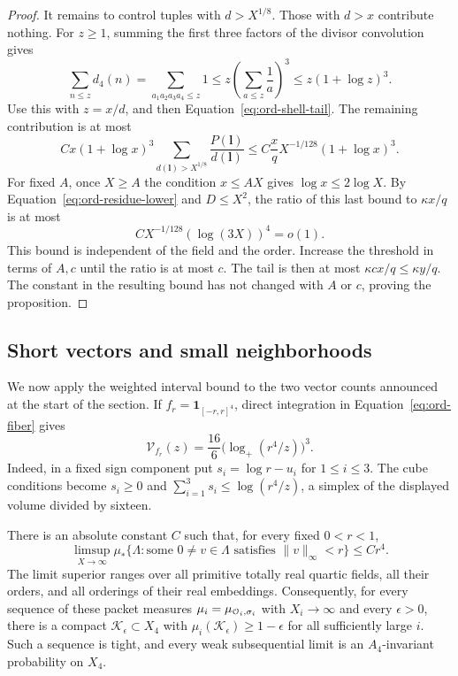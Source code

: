 \begin{proof}
It remains to control tuples with \(d>X^{1/8}\).  Those with \(d>x\)
contribute nothing.  For \(z\ge1\), summing the first three factors
of the divisor convolution gives
\[
 \sum_{n\le z}d_4(n)
 =\sum_{a_1a_2a_3a_4\le z}1
 \le z\left(\sum_{a\le z}\frac1a\right)^3
 \le z(1+\log z)^3 .
\]
Use this with \(z=x/d\), and then
Equation~\eqref{eq:ord-shell-tail}.  The remaining contribution is
at most
\[
 Cx(1+\log x)^3
       \sum_{d(\boldsymbol l)>X^{1/8}}
             \frac{P(\boldsymbol l)}{d(\boldsymbol l)}
 \le C\frac{x}{q}X^{-1/128}(1+\log x)^3 .
\]
For fixed \(A\), once \(X\ge A\) the condition \(x\le AX\) gives
\(\log x\le2\log X\).  By
Equation~\eqref{eq:ord-residue-lower} and \(D\le X^2\), the ratio of
this last bound to \(\kappa x/q\) is at most
\[
 C X^{-1/128}(\log(3X))^4=o(1).
\]
This bound is independent of the field and the order.  Increase the
threshold in terms of \(A,c\) until the ratio is at most \(c\).
The tail is then at most \(\kappa cx/q\le\kappa y/q\).  The constant
in the resulting bound has not changed with \(A\) or \(c\), proving
the proposition.
\end{proof}

\subsection{Short vectors and small neighborhoods}

We now apply the weighted interval bound to the two vector counts
announced at the start of the section.  If \(f_r=\mathbf 1_{[-r,r]^4}\), direct integration
in Equation~\eqref{eq:ord-fiber} gives
\begin{equation}\label{eq:ord-cube-fiber}
 \mathcal V_{f_r}(z)=\frac{16}{6}
                       \bigl(\log_+(r^4/z)\bigr)^3 .
\end{equation}
Indeed, in a fixed sign component put \(s_i=\log r-u_i\) for
\(1\le i\le3\).  The cube conditions become \(s_i\ge0\) and
\(\sum_{i=1}^3s_i\le\log(r^4/z)\), a simplex of the displayed volume
divided by sixteen.

\begin{proposition}[Tightness]\label{prop:ord-tightness}
There is an absolute constant \(C\) such that, for every fixed
\(0<r<1\),
\begin{equation}\label{eq:ord-cusp}
 \limsup_{X\longrightarrow\infty}
 \mu_*\{\Lambda:\text{some }0\ne v\in\Lambda
                         \text{ satisfies }\|v\|_\infty<r\}
       \le Cr^4 .
\end{equation}
The limit superior ranges over all primitive totally real quartic
fields, all their orders, and all orderings of their real embeddings.
Consequently, for every sequence of these packet measures
\(\mu_i=\mu_{\mathcal O_i,\sigma_i}\) with \(X_i\to\infty\) and every
\(\epsilon>0\), there is a compact \(\mathcal K_\epsilon\subset X_4\) with
\(\mu_i(\mathcal K_\epsilon)\ge1-\epsilon\) for all sufficiently large \(i\).
Such a sequence is tight, and every weak subsequential limit is an
\(A_4\)-invariant probability on \(X_4\).
\end{proposition}

